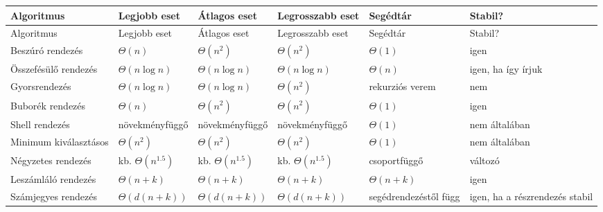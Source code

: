 \begingroup
\setlength{\tabcolsep}{3.5pt}
\begin{longtable}{L{0.20\textwidth}L{0.16\textwidth}L{0.16\textwidth}L{0.16\textwidth}L{0.14\textwidth}L{0.08\textwidth}}
\toprule
Algoritmus & Legjobb eset & Átlagos eset & Legrosszabb eset & Segédtár & Stabil? \\
\midrule
\endfirsthead
\toprule
Algoritmus & Legjobb eset & Átlagos eset & Legrosszabb eset & Segédtár & Stabil? \\
\midrule
\endhead
Beszúró rendezés & $\Theta(n)$ & $\Theta(n^2)$ & $\Theta(n^2)$ & $\Theta(1)$ & igen \\
Összefésülő rendezés & $\Theta(n\log n)$ & $\Theta(n\log n)$ & $\Theta(n\log n)$ & $\Theta(n)$ & igen, ha így írjuk \\
Gyorsrendezés & $\Theta(n\log n)$ & $\Theta(n\log n)$ & $\Theta(n^2)$ & rekurziós verem & nem \\
Buborék rendezés & $\Theta(n)$ & $\Theta(n^2)$ & $\Theta(n^2)$ & $\Theta(1)$ & igen \\
Shell rendezés & növekményfüggő & növekményfüggő & növekményfüggő & $\Theta(1)$ & nem általában \\
Minimum kiválasztásos & $\Theta(n^2)$ & $\Theta(n^2)$ & $\Theta(n^2)$ & $\Theta(1)$ & nem általában \\
Négyzetes rendezés & kb. $\Theta(n^{1.5})$ & kb. $\Theta(n^{1.5})$ & kb. $\Theta(n^{1.5})$ & csoportfüggő & változó \\
Leszámláló rendezés & $\Theta(n+k)$ & $\Theta(n+k)$ & $\Theta(n+k)$ & $\Theta(n+k)$ & igen \\
Számjegyes rendezés & $\Theta(d(n+k))$ & $\Theta(d(n+k))$ & $\Theta(d(n+k))$ & segédrendezéstől függ & igen, ha a részrendezés stabil \\
\bottomrule
\end{longtable}
\endgroup
